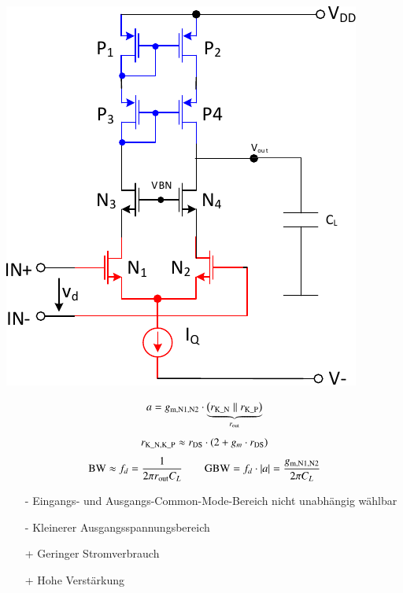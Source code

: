 \begin{minipage}[t]{0.35\columnwidth}
    \includegraphics[width=\columnwidth, align=t]{images/11_OTA_einstufig_kaskode.pdf}
\end{minipage}
\hfill
\begin{minipage}[t]{0.62\columnwidth}
    \[
        a = g_{\rm m, N1, N2} \cdot \underbrace{ \left( r_{\rm K\_N} \parallel r_{\rm K\_P} \right) }_{r_{\rm out}} 
    \]
    \[
        r_{\rm K\_N, K\_P} \approx r_{\rm DS} \cdot (2+ g_m \cdot r_{\rm DS})
    \]
    \[
        \text{BW} \approx f_d = \frac{1}{2\pi r_{\rm out} C_{L}} \qquad \text{GBW} = f_d \cdot \left|a\right| = \frac{g_{\rm m, N1, N2}}{2 \pi C_{L}}
    \]

    \smallskip

    \begin{itemize}
        \item[-] Eingangs- und Ausgangs-Common-Mode-Bereich nicht unabhängig wählbar
        \item[-] Kleinerer Ausgangsspannungsbereich
        \item[+] Geringer Stromverbrauch
        \item[+] Hohe Verstärkung
    \end{itemize}
\end{minipage}


